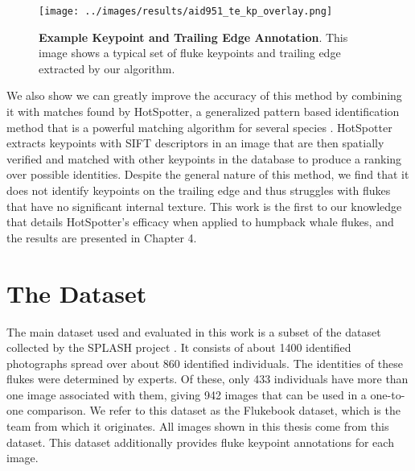 
\begin{figure}[t]%
\centering
\texttt{[image: ../images/results/aid951\_te\_kp\_overlay.png]}
\caption{\textbf{Example Keypoint and Trailing Edge Annotation}. This image shows a typical set of fluke keypoints and trailing edge extracted by our algorithm.}
\label{fig:example_overlay}
\end{figure}

We also show we can greatly improve the accuracy of this method by combining it with matches found by HotSpotter, a generalized pattern based identification method that is a powerful matching algorithm for several species \cite{crall_hotspotter_2013}.
HotSpotter extracts keypoints with SIFT descriptors \cite{lowe2004distinctive} in an image that are then spatially verified and matched with other keypoints in the database to produce a ranking over possible identities. 
Despite the general nature of this method, we find that it does not identify keypoints on the trailing edge and thus struggles with flukes that have no significant internal texture. 
This work is the first to our knowledge that details HotSpotter's efficacy when applied to humpback whale flukes, and the results are presented in Chapter 4.

\section{The Dataset}

The main dataset used and evaluated in this work is a subset of the dataset collected by the SPLASH project \cite{calambokidis2008splash}. 
It consists of about 1400 identified photographs spread over about 860 identified individuals.
The identities of these flukes were determined by experts.
Of these, only 433 individuals have more than one image associated with them, giving 942 images that can be used in a one-to-one comparison.
We refer to this dataset as the Flukebook dataset, which is the team from which it originates.
All images shown in this thesis come from this dataset.
This dataset additionally provides fluke keypoint annotations for each image.

